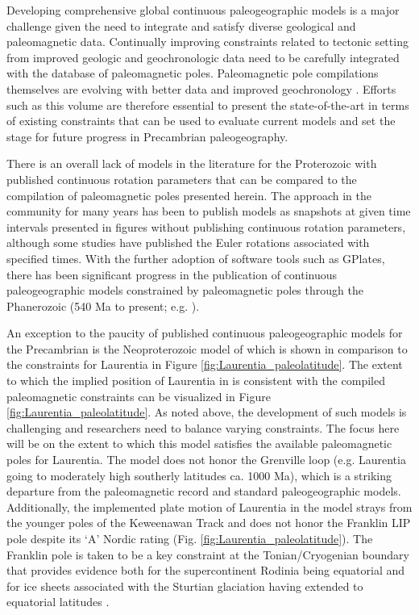 \documentclass[twocolumn, switch]{article} %
\begin{document}
Developing comprehensive global continuous paleogeographic models is a major challenge given the need to integrate and satisfy diverse geological and paleomagnetic data. Continually improving constraints related to tectonic setting from improved geologic and geochronologic data need to be carefully integrated with the database of paleomagnetic poles. Paleomagnetic pole compilations themselves are evolving with better data and improved geochronology \citep{Evans2021a}. Efforts such as this volume are therefore essential to present the state-of-the-art in terms of existing constraints that can be used to evaluate current models and set the stage for future progress in Precambrian paleogeography.

There is an overall lack of models in the literature for the Proterozoic with published continuous rotation parameters that can be compared to the compilation of paleomagnetic poles presented herein. The approach in the community for many years has been to publish models as snapshots at given time intervals presented in figures without publishing continuous rotation parameters, although some studies have published the Euler rotations associated with specified times. With the further adoption of software tools such as GPlates, there has been significant progress in the publication of continuous paleogeographic models constrained by paleomagnetic poles through the Phanerozoic (540 Ma to present; e.g. \citealp{Torsvik2017a}).

An exception to the paucity of published continuous paleogeographic models for the Precambrian is the Neoproterozoic model of \cite{Merdith2017b} which is shown in comparison to the constraints for Laurentia in Figure \ref{fig:Laurentia_paleolatitude}. The extent to which the implied position of Laurentia in \cite{Merdith2017b} is consistent with the compiled paleomagnetic constraints can be visualized in Figure \ref{fig:Laurentia_paleolatitude}. As noted above, the development of such models is challenging and  researchers need to balance varying constraints. The focus here will be on the extent to which this model satisfies the available paleomagnetic poles for Laurentia. The model does not honor the Grenville loop (e.g. Laurentia going to moderately high southerly latitudes ca. 1000 Ma), which is a striking departure from the paleomagnetic record and standard paleogeographic models. Additionally, the implemented plate motion of Laurentia in the \cite{Merdith2017b} model strays from the younger poles of the Keweenawan Track and does not honor the Franklin LIP pole \citep{Denyszyn2009b} despite its `A' Nordic rating (Fig. \ref{fig:Laurentia_paleolatitude}). The Franklin pole is taken to be a key constraint at the Tonian/Cryogenian boundary that provides evidence both for the supercontinent Rodinia being equatorial and for ice sheets associated with the Sturtian glaciation having extended to equatorial latitudes \citep{Macdonald2010a}.
\end{document}
